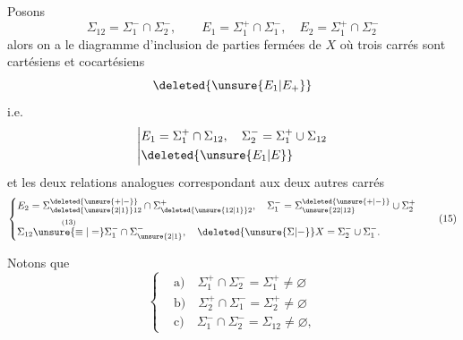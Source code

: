 \begingroup
\makeatletter\tagsleft@true\makeatother
Posons
\[
\Sigma_{12}=\Sigma_1^-\cap\Sigma_2^-,\qquad E_1=\Sigma_1^+\cap\Sigma_1^-,\quad E_2=\Sigma_1^+\cap\Sigma_2^-\tag*{(13)}
\]
alors on a le diagramme d'inclusion de parties fermées de $X$
\usetikzlibrary{decorations.pathmorphing}
où  trois carrés sont cartésiens et cocartésiens
\[
\deleted{\unsure{E_1|E_+}}
\]
i.e.
\[
\left|\begin{aligned}
&E_1=\Sigma_1^+\cap\Sigma_{12},\quad\Sigma_2^-=\Sigma_1^+\cup\Sigma_{12}\\
&\deleted{\unsure{E_1|E}}
\end{aligned}\right.
\]
et les deux relations analogues correspondant aux deux autres carrés
\[
\left\{\begin{aligned}
&E_2=\Sigma_{\deleted{\unsure{2|1}}12}^{\deleted{\unsure{+|-}}}\cap\Sigma_{\deleted{\unsure{12|1}}2}^+,\quad \Sigma_1^-=\Sigma_{\unsure{22|12}}^{\deleted{\unsure{+|-}}}\cup\Sigma_2^+\\
&\Sigma_{12}\overset{(13)}{\unsure{\equiv|=}}\Sigma_1^-\cap\Sigma_{\unsure{2|1}}^-,\quad \deleted{\unsure{\Sigma|{-}}}X=\Sigma_2^-\cup\Sigma_1^-.
\end{aligned}\right.\tag*{(15)}
\]

Notons que
\[
\left\{\begin{aligned}
&\text{a)}\quad\Sigma_1^+\cap\Sigma_2^-=\Sigma_1^+\ne\varnothing\\
&\text{b)}\quad\Sigma_2^+\cap\Sigma_1^-=\Sigma_2^+\ne\varnothing\\
&\text{c)}\quad\Sigma_1^-\cap\Sigma_2^-=\Sigma_{12}\ne\varnothing,
\end{aligned}\right.\tag*{(16)}
\]


